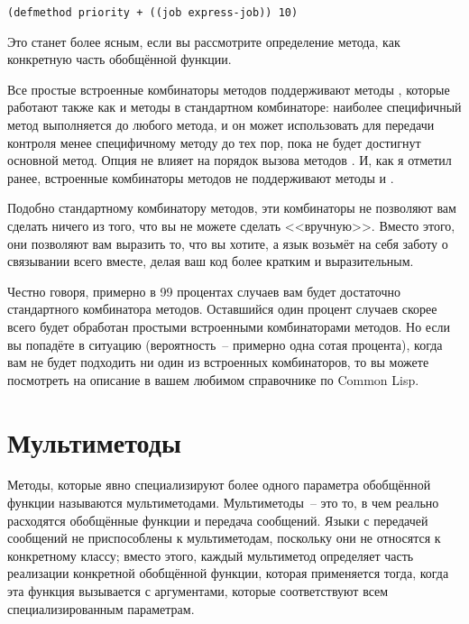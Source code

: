 \begin{lstlisting}
(defmethod priority + ((job express-job)) 10)
\end{lstlisting}

Это станет более ясным, если вы рассмотрите определение метода, как конкретную часть
обобщённой функции.

Все простые встроенные комбинаторы методов поддерживают методы , которые
работают также как и методы  в стандартном комбинаторе: наиболее специфичный
метод  выполняется до любого метода, и он может использовать
 для передачи контроля менее специфичному методу  до
тех пор, пока не будет достигнут основной метод.  Опция  не
влияет на порядок вызова методов .  И, как я отметил ранее, встроенные
комбинаторы методов не поддерживают методы  и .

Подобно стандартному комбинатору методов, эти комбинаторы не позволяют вам сделать ничего
из того, что вы не можете сделать <<вручную>>.  Вместо этого, они позволяют вам выразить то,
что вы хотите, а язык возьмёт на себя заботу о связывании всего вместе, делая ваш код
более кратким и выразительным.

Честно говоря, примерно в 99 процентах случаев вам будет достаточно стандартного
комбинатора методов.  Оставшийся один процент случаев скорее всего будет обработан
простыми встроенными комбинаторами методов.  Но если вы попадёте в ситуацию
(вероятность~-- примерно одна сотая процента), когда вам не будет подходить ни один из
встроенных комбинаторов, то вы можете посмотреть на описание
 в вашем любимом справочнике по Common Lisp.

\section{Мультиметоды}

Методы, которые явно специализируют более одного параметра обобщённой функции называются
мультиметодами. Мультиметоды~-- это то, в чем реально расходятся обобщённые функции и
передача сообщений.  Языки с передачей сообщений не приспособлены к мультиметодам,
поскольку они не относятся к конкретному классу; вместо этого, каждый мультиметод
определяет часть реализации конкретной обобщённой функции, которая применяется тогда,
когда эта функция вызывается с аргументами, которые соответствуют всем специализированным
параметрам.

